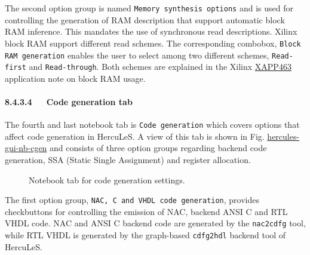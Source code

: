 \documentclass[a4paper]{article}
\begin{document}
The second option group is named \texttt{Memory synthesis options} and is used for controlling the generation of RAM description that support automatic block RAM inference. This mandates the use of synchronous read descriptions. Xilinx block RAM support different read schemes. The corresponding combobox, \texttt{Block RAM generation} enables the user to select among two different schemes, \texttt{Read-first} and \texttt{Read-through}. Both schemes are explained in the Xilinx \href{http://www.xilinx.com/support/documentation/application_notes/xapp463.pdf}{XAPP463} application note on block RAM usage.


\paragraph{8.4.3.4~~~Code generation tab%
  \label{code-generation-tab}%
}

The fourth and last notebook tab is \texttt{Code generation} which covers options that affect code generation in HercuLeS. A view of this tab is shown in Fig. \hyperref[hercules-gui-nb-cgen]{hercules-gui-nb-cgen} and consists of three option groups regarding backend code generation, SSA (Static Single Assignment) and register allocation.
\begin{figure}
\label{hercules-gui-nb-cgen}
\noindent{}
\caption{Notebook tab for code generation settings.}
\end{figure}

The first option group, \texttt{NAC, C and VHDL code generation}, provides checkbuttons for controlling the emission of NAC, backend ANSI C and RTL VHDL code. NAC and ANSI C backend code are generated by the \texttt{nac2cdfg} tool, while RTL VHDL is generated by the graph-based \texttt{cdfg2hdl} backend tool of HercuLeS.
\end{document}
